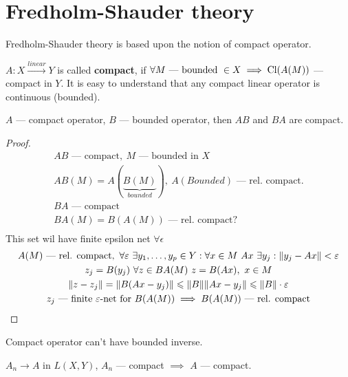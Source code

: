 \section{Fredholm-Shauder theory}
Fredholm-Shauder theory is based upon the notion of compact operator.
\begin{defn}
  $A \colon X \xrightarrow{linear} Y$ is called \textbf{compact}, if $\forall M 
  \text{ --- bounded } \in X \implies \cl{A(M)}$ --- compact in $Y$. It is easy to understand that any
  compact linear operator is continuous (bounded).
\end{defn}

\begin{stm}
  $A$ --- compact operator, $B$ --- bounded operator, then $AB$ and $BA$ are compact.
\end{stm}

\begin{proof}
  \begin{gather*}
    AB \text{ --- compact},\ M \text{ --- bounded in $X$} \\
    AB(M) = A(\underbrace{B(M)}_{bounded}),\ A(Bounded) \text{ --- rel.
      compact}. \\
    BA \text{ --- compact} \\
    BA(M) = B(A(M)) \text{ --- rel. compact} ? \\
  \end{gather*}
  This set wil have finite epsilon net $\forall \epsilon$
  \begin{gather*}
    A(M) \text{ --- rel. compact},\ \forall \epsilon\ \exists y_1, \dotsc, y_p
    \in Y : \forall x \in M\ Ax\ \exists y_j : \|y_j - Ax\| < \epsilon \\
    z_j = B(y_j)\ \forall z \in BA(M)\ z = B(Ax),\ x \in M \\
    \|z - z_j\| = \|B(Ax - y_j)\| \leq \|B\| \|Ax - y_j\| \leq \|B\| \cdot
    \epsilon \\
    z_j \text{ --- finite $\epsilon$-net for $B(A(M))$} \implies B(A(M)) \text{
      --- rel. compact} \qedhere
  \end{gather*}
\end{proof}

\begin{stm}
  Compact operator can't have bounded inverse.
\end{stm}

\begin{stm}
  $A_n \to A$ in $L(X, Y)$, $A_n$ --- compact $\implies$ $A$ --- compact.
\end{stm}

